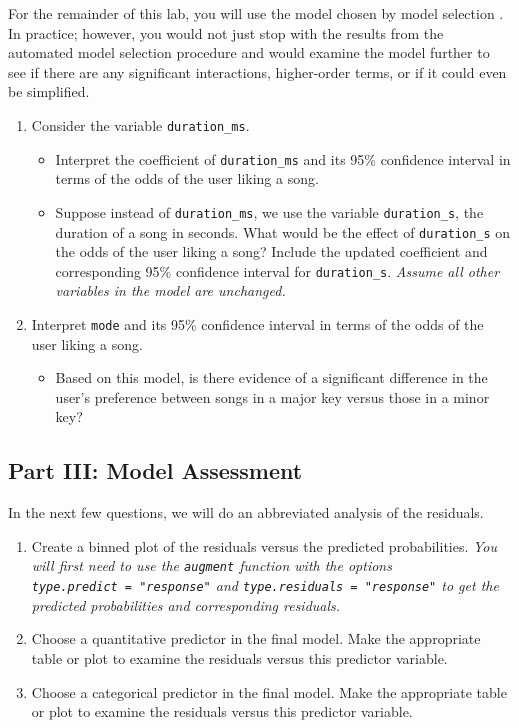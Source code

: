 \documentclass[]{book}
\providecommand{\tightlist}{%
  \setlength{\itemsep}{0pt}\setlength{\parskip}{0pt}}
\begin{document}
For the remainder of this lab, you will use the model chosen by model
selection . In practice; however, you would not just stop with the
results from the automated model selection procedure and would examine
the model further to see if there are any significant interactions,
higher-order terms, or if it could even be simplified.

\begin{enumerate}
\def\labelenumi{\arabic{enumi}.}
\setcounter{enumi}{7}
\item
  Consider the variable \texttt{duration\_ms}.

  \begin{itemize}
  \tightlist
  \item
    Interpret the coefficient of \texttt{duration\_ms} and its 95\%
    confidence interval in terms of the odds of the user liking a song.
  \item
    Suppose instead of \texttt{duration\_ms}, we use the variable
    \texttt{duration\_s}, the duration of a song in seconds. What would
    be the effect of \texttt{duration\_s} on the odds of the user liking
    a song? Include the updated coefficient and corresponding 95\%
    confidence interval for \texttt{duration\_s}. \emph{Assume all other
    variables in the model are unchanged.}
  \end{itemize}
\item
  Interpret \texttt{mode} and its 95\% confidence interval in terms of
  the odds of the user liking a song.

  \begin{itemize}
  \tightlist
  \item
    Based on this model, is there evidence of a significant difference
    in the user's preference between songs in a major key versus those
    in a minor key?
  \end{itemize}
\end{enumerate}

\subsection{Part III: Model Assessment}\label{part-iii-model-assessment}

In the next few questions, we will do an abbreviated analysis of the
residuals.

\begin{enumerate}
\def\labelenumi{\arabic{enumi}.}
\setcounter{enumi}{9}
\item
  Create a binned plot of the residuals versus the predicted
  probabilities. \emph{You will first need to use the \texttt{augment}
  function with the options \texttt{type.predict\ =\ "response"} and
  \texttt{type.residuals\ =\ "response"} to get the predicted
  probabilities and corresponding residuals.}
\item
  Choose a quantitative predictor in the final model. Make the
  appropriate table or plot to examine the residuals versus this
  predictor variable.
\item
  Choose a categorical predictor in the final model. Make the
  appropriate table or plot to examine the residuals versus this
  predictor variable.
\end{enumerate}
\end{document}
